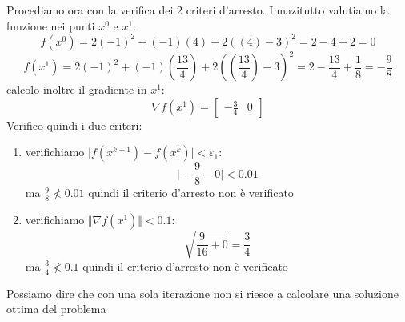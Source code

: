 \documentclass[a4paper,12pt, oneside]{book}
\begin{document}
Procediamo ora con la verifica dei 2 criteri d'arresto. Innazitutto
valutiamo la funzione nei punti $x^0$ e $x^1$:
\[f(x^0)=2(-1)^2+(-1)(4)+2((4)-3)^2= 2-4+2=0\]
\[f(x^1)=2(-1)^2+(-1)(\frac{13}{4})+2((\frac{13}{4})-3)^2=2-\frac{13}{4}
  +\frac{1}{8}=-\frac{9}{8}\]
calcolo inoltre il gradiente in $x^1$:
\[\nabla f(x^1)=[\begin{matrix}
    -\frac{3}{4} & 0
  \end{matrix}]\]
Verifico quindi i due criteri:
\begin{enumerate}
  \item verifichiamo $\vert f(x^{k+1}) - f(x^k)\vert < \varepsilon_1$:
  \[\vert -\frac{9}{8}-0\vert <0.01\]
  ma $\frac{9}{8}\not < 0.01$ quindi il criterio d'arresto non è
  verificato
  \item verifichiamo $\Vert \nabla f(x^1)\Vert< 0.1$:
  \[\sqrt{\frac{9}{16}+0}=\frac{3}{4}\]
  ma $\frac{3}{4}\not < 0.1$ quindi il criterio d'arresto non è
  verificato
\end{enumerate}
\begin{shaded}
  Possiamo dire che con una sola iterazione non si riesce a calcolare
  una soluzione ottima del problema
\end{shaded}
\end{document}
